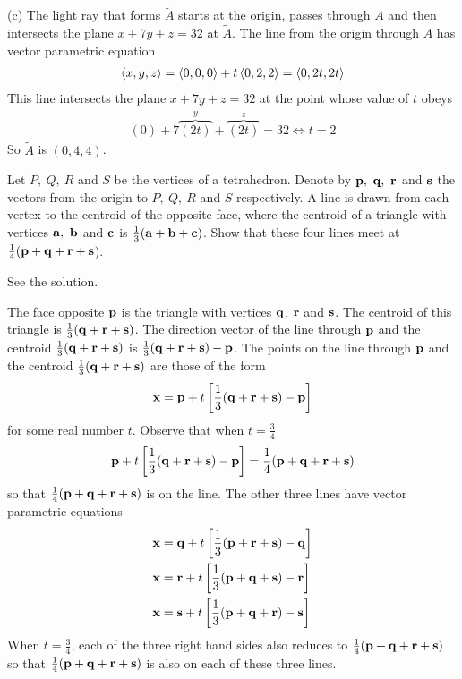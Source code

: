 \begin{solution}
(c) 
The light ray that forms $\tilde A$ starts at the origin,
passes through $A$ and then intersects the plane $x+7y+z=32$
at $\tilde A$. The line from the origin through $A$ has vector
parametric equation
\begin{align*}
\left< x,y,z\right> = \left< 0,0,0 \right> +t \left< 0,2,2\right>
               =\left< 0,2t,2t\right>
\end{align*}
This line intersects the plane $x+7y+z=32$ at the point whose value of $t$
obeys
\begin{align*}
(0) +7\overbrace{(2t)}^{y} +\overbrace{(2t)}^{z} =32
\iff t=2
\end{align*}
So $\tilde A$ is $(0,4,4)$.
\end{solution}

\begin{question}
Let $P,\ Q,\ R$ and $S$ be the vertices of a tetrahedron.
Denote by $\mathbf{p},\ \mathbf{q},\ \mathbf{r}$ and $\mathbf{s}$ the vectors from the origin
to $P,\ Q,\ R$ and $S$ respectively. A line is drawn from each vertex to
the centroid of the opposite face, where the centroid of a triangle with 
vertices $\mathbf{a},\ \mathbf{b}$ and $\mathbf{c}$ is $\frac{1}{3}(\mathbf{a}+\mathbf{b}+\mathbf{c})$. 
Show that these four lines meet at $\frac{1}{4}(\mathbf{p}+\mathbf{q}+\mathbf{r}+\mathbf{s}$).
\end{question}

%

\begin{answer}
See the solution.
\end{answer}

\begin{solution}
The face opposite $\mathbf{p}$ is the triangle with vertices $\mathbf{q}$, $\mathbf{r}$ and $\mathbf{s}$. 
The centroid of this triangle is $\frac{1}{3}(\mathbf{q}+\mathbf{r}+\mathbf{s})$. 
The direction vector of the line through $\mathbf{p}$ and the 
centroid $\frac{1}{3}(\mathbf{q}+\mathbf{r}+\mathbf{s})$ is 
$\frac{1}{3}(\mathbf{q}+\mathbf{r}+\mathbf{s})-\mathbf{p}$. The points on the line through
$\mathbf{p}$ and the centroid $\frac{1}{3}(\mathbf{q}+\mathbf{r}+\mathbf{s})$ are those
of the form
\begin{equation*}
\mathbf{x}=\mathbf{p}+ t\left[\frac{1}{3}(\mathbf{q}+\mathbf{r}+\mathbf{s})-\mathbf{p}\right]
\end{equation*}
for some real number $t$. Observe that when $t=\frac{3}{4}$
$$
\mathbf{p}+ t\left[\frac{1}{3}(\mathbf{q}+\mathbf{r}+\mathbf{s})-\mathbf{p}\right]
=\frac{1}{4}(\mathbf{p}+\mathbf{q}+\mathbf{r}+\mathbf{s})
$$
so that $\frac{1}{4}(\mathbf{p}+\mathbf{q}+\mathbf{r}+\mathbf{s})$ is on the line.
The other three lines have vector parametric equations
\begin{align*}
\mathbf{x}&=\mathbf{q}+ t\left[\frac{1}{3}(\mathbf{p}+\mathbf{r}+\mathbf{s})-\mathbf{q}\right] \\
\mathbf{x}&=\mathbf{r}+ t\left[\frac{1}{3}(\mathbf{p}+\mathbf{q}+\mathbf{s})-\mathbf{r}\right] \\
\mathbf{x}&=\mathbf{s}+ t\left[\frac{1}{3}(\mathbf{p}+\mathbf{q}+\mathbf{r})-\mathbf{s}\right]
\end{align*}
When $t=\frac{3}{4}$, each of the three right hand sides also reduces
to $\frac{1}{4}(\mathbf{p}+\mathbf{q}+\mathbf{r}+\mathbf{s})$ so that
$\frac{1}{4}(\mathbf{p}+\mathbf{q}+\mathbf{r}+\mathbf{s})$ is also on each of these
three lines.
\end{solution}


